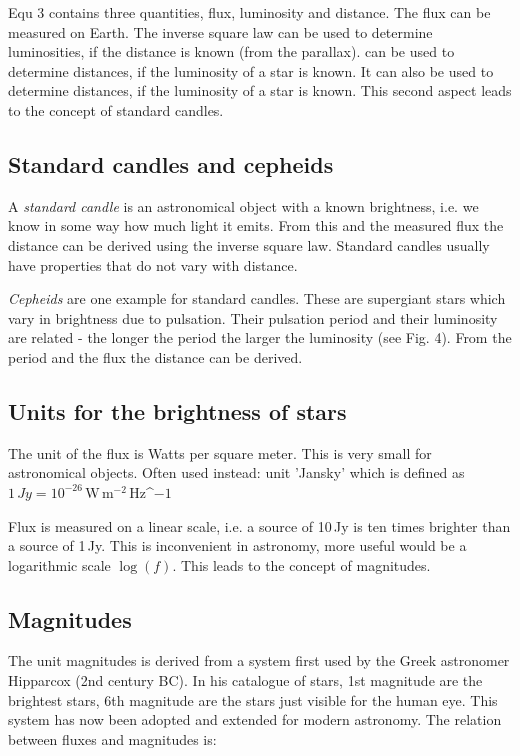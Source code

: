 Equ 3 contains three quantities, flux, luminosity and distance. The flux can be measured on Earth. The inverse square law can be used to determine luminosities, if the distance is known (from the parallax). can be used to determine distances, if the luminosity of a star is known. It can also be used to determine distances, if the luminosity of a star is known. This second aspect leads to the concept of standard candles.

\subsection{Standard candles and cepheids}

A \textit{standard candle} is an astronomical object with a known brightness, i.e. we know in some way how much light it emits. From this and the measured flux the distance can be derived using the inverse square law. Standard candles usually have properties that do not vary with distance.

\textit{Cepheids} are one example for standard candles. These are supergiant stars which vary in brightness due to pulsation. Their pulsation period and their luminosity are related - the longer the period the larger the luminosity (see Fig. 4). From the period and the flux the distance can be derived.

\subsection{Units for the brightness of stars}

The unit of the flux is Watts per square meter. This is very small for astronomical objects. Often used instead: unit 'Jansky' which is defined as $1\,Jy = 10^{-26}$\,W\,m$^{-2}$\,Hz^${-1}$

Flux is measured on a linear scale, i.e. a source of 10\,Jy is ten times brighter than a source of 1\,Jy. This is inconvenient in astronomy, more useful would be a logarithmic scale $\log{(f)}$. This leads to the concept of magnitudes.

\subsection{Magnitudes}

The unit magnitudes is derived from a system first used by the Greek astronomer Hipparcox (2nd century BC). In his catalogue of stars, 1st magnitude are the brightest stars, 6th magnitude are the stars just visible for the human eye. This system has now been adopted and extended for modern astronomy. The relation between fluxes and magnitudes is:

